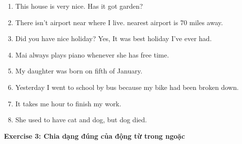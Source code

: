 \documentclass[12pt,a4paper,twoside]{article}
\begin{document}
\begin{enumerate}[label=\textbf{\arabic*.}, leftmargin=2em, itemsep=6pt, topsep=4pt]
\item This house is very nice. Has it got \underline{\hspace{1.3cm}} garden?
\item There isn't \underline{\hspace{1.3cm}} airport near where I live. \underline{\hspace{1.3cm}} nearest airport is 70 miles away.
\item Did you have \underline{\hspace{1.3cm}} nice holiday? Yes, It was \underline{\hspace{1.3cm}} best holiday I've ever had.
\item Mai always plays \underline{\hspace{1.3cm}} piano whenever she has free time.
\item My daughter was born on \underline{\hspace{1.3cm}} fifth of January.
\item Yesterday I went to \underline{\hspace{1.3cm}} school by \underline{\hspace{1.3cm}} bus because my bike had been broken down.
\item It takes me \underline{\hspace{1.3cm}} hour to finish my work.
\item She used to have \underline{\hspace{1.3cm}} cat and \underline{\hspace{1.3cm}} dog, but \underline{\hspace{1.3cm}} dog died.
\end{enumerate}
\begin{groupbox}\textbf{\large Exercise 3: Chia dạng đúng của động từ trong ngoặc}\end{groupbox}
\end{document}
